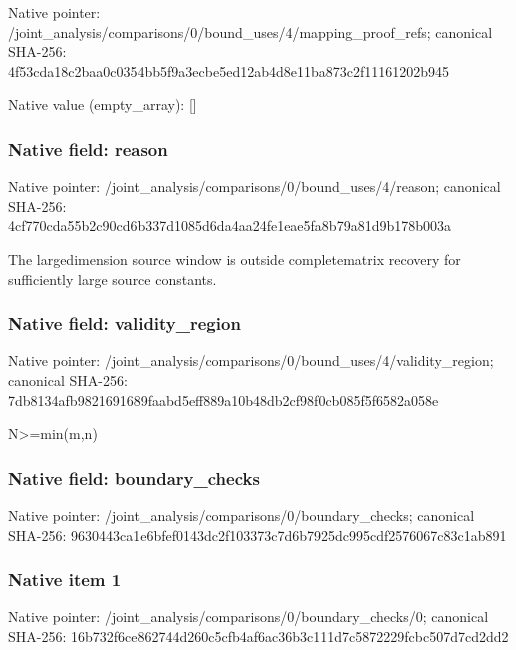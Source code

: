 \documentclass[10pt,a4paper]{article}
\begin{document}
Native pointer: /joint\_analysis/comparis\allowbreak{}ons/0/bound\_uses/4/mappi\allowbreak{}ng\_proof\_refs; canonical SHA-256: 4f53cda18c2baa0c0354bb5f\allowbreak{}9a3ecbe5ed12ab4d8e11ba87\allowbreak{}3c2f11161202b945



Native value (empty\_array): []



\subsubsection{Native field: reason}


Native pointer: /joint\_analysis/comparis\allowbreak{}ons/0/bound\_uses/4/reaso\allowbreak{}n; canonical SHA-256: 4cf770cda55b2c90cd6b337d\allowbreak{}1085d6da4aa24fe1eae5fa8b\allowbreak{}79a81d9b178b003a


The largedimension source window is outside completematrix recovery for sufficiently large source constants.


\subsubsection{Native field: validity\_region}


Native pointer: /joint\_analysis/comparis\allowbreak{}ons/0/bound\_uses/4/valid\allowbreak{}ity\_region; canonical SHA-256: 7db8134afb9821691689faab\allowbreak{}d5eff889a10b48db2cf98f0c\allowbreak{}b085f5f6582a058e


N>=min(m,n)


\subsubsection{Native field: boundary\_checks}


Native pointer: /joint\_analysis/comparis\allowbreak{}ons/0/boundary\_checks; canonical SHA-256: 9630443ca1e6bfef0143dc2f\allowbreak{}103373c7d6b7925dc995cdf2\allowbreak{}576067c83c1ab891



\subsubsection{Native item 1}


Native pointer: /joint\_analysis/comparis\allowbreak{}ons/0/boundary\_checks/0; canonical SHA-256: 16b732f6ce862744d260c5cf\allowbreak{}b4af6ac36b3c111d7c587222\allowbreak{}9fcbc507d7cd2dd2
\end{document}
